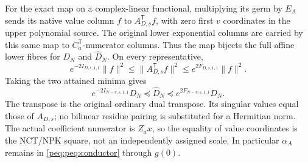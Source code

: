 For the exact map on a complex-linear functional, multiplying its germ by $E_A$ sends its native value column $f$ to $A_{D,s}^{\mathsf T}f$, with zero first $v$ coordinates in the upper polynomial source. The original lower exponential columns are carried by this same map to $C_a^{\mathsf T}$-numerator columns. Thus the map bijects the full affine lower fibres for $D_N$ and $\widehat D_N$. On every representative,
\[
 e^{-2I_{D,s,1,1}}\|f\|^2\le
      \|A_{D,s}^{\mathsf T}f\|^2
       \le e^{2F_{D,s,1,1}}\|f\|^2.
\]
Taking the two attained minima gives
\begin{equation}
 \boxed{e^{-2I_{N-v,s,1,1}}D_N
 \preceq\widehat D_N\preceq e^{2F_{N-v,s,1,1}}D_N.}
 \label{peq:peq:native-transfer}
\end{equation}
The transpose is the original ordinary dual transpose. Its singular values equal those of $A_{D,s}$; no bilinear residue pairing is substituted for a Hermitian norm. The actual coefficient numerator is $Z_ax$, so the equality of value coordinates is the NCT/NPK square, not an independently assigned scale. In particular $\alpha_A$ remains in \eqref{peq:peq:conductor} through $g(0)$.

